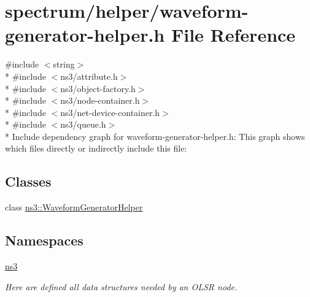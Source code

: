 \hypertarget{waveform-generator-helper_8h}{}\section{spectrum/helper/waveform-\/generator-\/helper.h File Reference}
\label{waveform-generator-helper_8h}
{\ttfamily \#include $<$string$>$}\\*
{\ttfamily \#include $<$ns3/attribute.\+h$>$}\\*
{\ttfamily \#include $<$ns3/object-\/factory.\+h$>$}\\*
{\ttfamily \#include $<$ns3/node-\/container.\+h$>$}\\*
{\ttfamily \#include $<$ns3/net-\/device-\/container.\+h$>$}\\*
{\ttfamily \#include $<$ns3/queue.\+h$>$}\\*
Include dependency graph for waveform-\/generator-\/helper.h\+:
This graph shows which files directly or indirectly include this file\+:
\subsection*{Classes}
\begin{DoxyCompactItemize}
\item 
class \hyperlink{classns3_1_1WaveformGeneratorHelper}{ns3\+::\+Waveform\+Generator\+Helper}
\end{DoxyCompactItemize}
\subsection*{Namespaces}
\begin{DoxyCompactItemize}
\item 
 \hyperlink{namespacens3}{ns3}
\begin{DoxyCompactList}\small\item\em Here are defined all data structures needed by an O\+L\+SR node. \end{DoxyCompactList}\end{DoxyCompactItemize}
